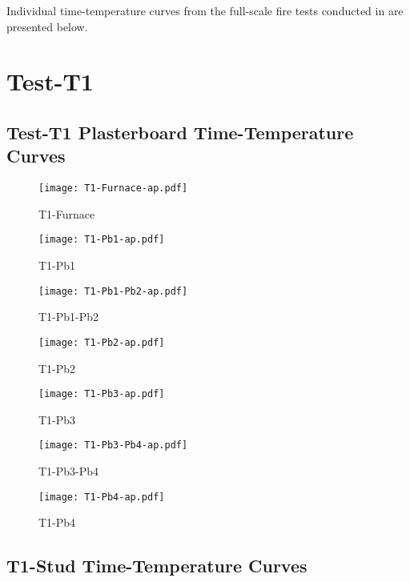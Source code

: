 Individual time-temperature curves from the full-scale fire tests conducted in  are presented below.

\section*{Test-T1}
\subsection*{Test-T1 Plasterboard Time-Temperature Curves}

\begin{figure}[htbp]
\centering
	\texttt{[image: T1-Furnace-ap.pdf]}
	\caption*{T1-Furnace}
\end{figure}
\begin{figure}[htbp]
	\centering
		\texttt{[image: T1-Pb1-ap.pdf]}
		\caption*{T1-Pb1}
\end{figure}
\begin{figure}[htbp]
	\centering
		\texttt{[image: T1-Pb1-Pb2-ap.pdf]}
		\caption*{T1-Pb1-Pb2}
\end{figure}
\begin{figure}[htbp]
	\centering
		\texttt{[image: T1-Pb2-ap.pdf]}
		\caption*{T1-Pb2}
\end{figure}
\begin{figure}[htbp]
	\centering
		\texttt{[image: T1-Pb3-ap.pdf]}
		\caption*{T1-Pb3}
\end{figure}
\begin{figure}[htbp]
	\centering
			\texttt{[image: T1-Pb3-Pb4-ap.pdf]}
			\caption*{T1-Pb3-Pb4}
\end{figure}
\begin{figure}[htbp]
	\centering
			\texttt{[image: T1-Pb4-ap.pdf]}
			\caption*{T1-Pb4}
\end{figure}

\pagebreak

\subsection*{T1-Stud Time-Temperature Curves}

